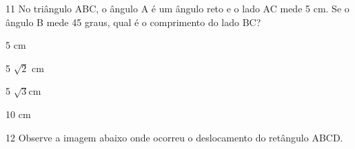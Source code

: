 
\num{11} No triângulo ABC, o ângulo A é um ângulo reto e o lado AC mede 5 cm.
Se o ângulo B mede 45 graus, qual é o comprimento do lado BC?

\begin{escolha}
\item
  5 cm
\item
  5 $\sqrt{2}$ cm
\item
  5 $\sqrt{3}$cm
\item
  10 cm
\end{escolha}




\num{12} Observe a imagem abaixo onde ocorreu o deslocamento do retângulo
ABCD.

